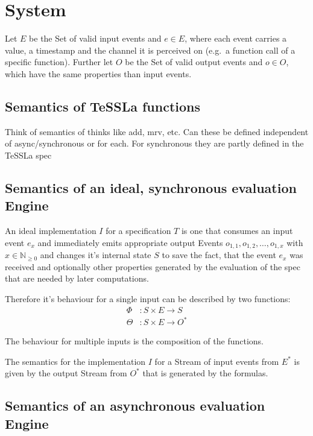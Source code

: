 %
\chapter{System}
\label{sec:system}

Let \(E\) be the Set of valid input events and \(e \in E\), where each event carries a value, a timestamp and the
channel it is perceived on (e.g.\ a function call of a specific function).
Further let \(O\) be the Set of valid output events and \(o \in O\), which have the same properties than input events.

\section{Semantics of TeSSLa functions}
Think of semantics of thinks like add, mrv, etc.
Can these be defined independent of async/synchronous or for each.
For synchronous they are partly defined in the TeSSLa spec

\section{Semantics of an ideal, synchronous evaluation Engine}
\label{sec:system:semantics_ideal}
An ideal implementation \(I\) for a specification \(T\) is one that consumes an input event \(e_x\) and immediately emits
appropriate output Events \(o_{1,1}, o_{1,2}, \dots , o_{1,x}\) with \(x \in \mathbb{N}_{\ge0}\) and changes it's internal
state \(S\) to save the fact, that the event \(e_x\) was received and optionally other properties generated by the
evaluation of the spec that are needed by later computations.

Therefore it's behaviour for a single input can be described by two functions:
\begin{align*}
    \Phi&: S \times E \rightarrow S \\
    \Theta&: S \times E \rightarrow O^*
\end{align*}

The behaviour for multiple inputs is the composition of the functions.

The semantics for the implementation \(I\) for a Stream of input events from \(E^*\) is given by the output Stream
from \(O^*\) that is generated by the formulas.

\section{Semantics of an asynchronous evaluation Engine}
\label{sec:system:semantics_async}

